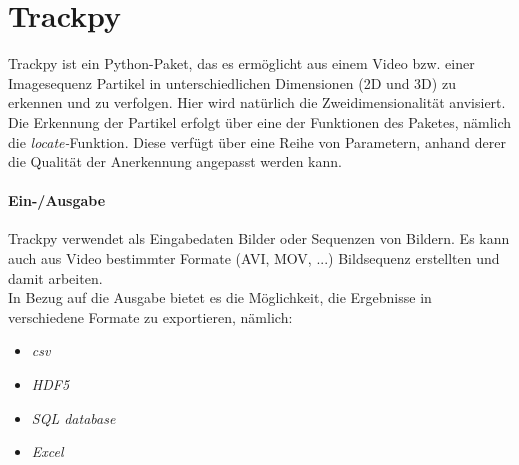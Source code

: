 \section{Trackpy \label{kap1_trackpy}}
Trackpy ist ein Python-Paket, das es ermöglicht aus einem Video bzw. einer Imagesequenz Partikel in unterschiedlichen Dimensionen (2D und 3D) zu erkennen und zu verfolgen. Hier wird natürlich die Zweidimensionalität anvisiert. Die Erkennung der Partikel erfolgt über eine der Funktionen des Paketes, nämlich die \textit{locate-}Funktion.
Diese verfügt über eine Reihe von Parametern, anhand derer die Qualität der Anerkennung angepasst werden kann.\\

\paragraph{Ein-/Ausgabe \\} 
Trackpy verwendet als Eingabedaten Bilder oder Sequenzen von Bildern. Es kann auch aus Video bestimmter Formate (AVI, MOV, ...) Bildsequenz erstellten und damit arbeiten.\\
In Bezug auf die Ausgabe bietet es die Möglichkeit, die Ergebnisse in verschiedene Formate zu exportieren, nämlich:
\begin{itemize}
\item \textit{csv}  
\item \textit{HDF5}
\item \textit{SQL database}
\item \textit{Excel}
\end{itemize}

